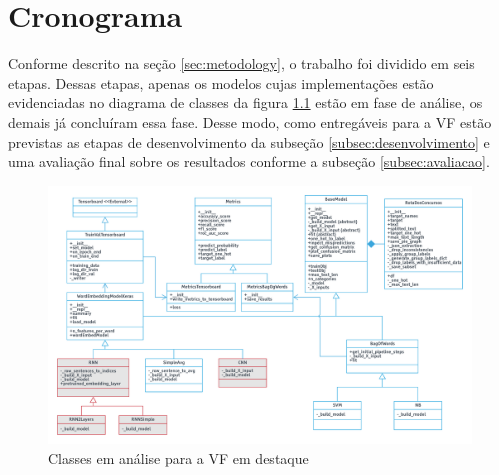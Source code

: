 \chapter{Cronograma}
Conforme descrito na seção \ref{sec:metodology}, o trabalho foi dividido em seis etapas. Dessas etapas, apenas os modelos cujas implementações estão evidenciadas no diagrama de classes da figura \ref{fig:ClassDiagramCronograma} estão em fase de análise, os demais já concluíram essa fase. Desse modo, como entregáveis para a VF estão previstas as etapas de desenvolvimento da subseção \ref{subsec:desenvolvimento} e uma avaliação final sobre os resultados conforme a subseção \ref{subsec:avaliacao}.

\begin{figure}[!ht]
	\centering
	\includegraphics[width=1.16\textwidth]{figures/ClassDiagram-Cronograma.png}
	\caption{Classes em análise para a VF em destaque}
	\label{fig:ClassDiagramCronograma}
\end{figure}
